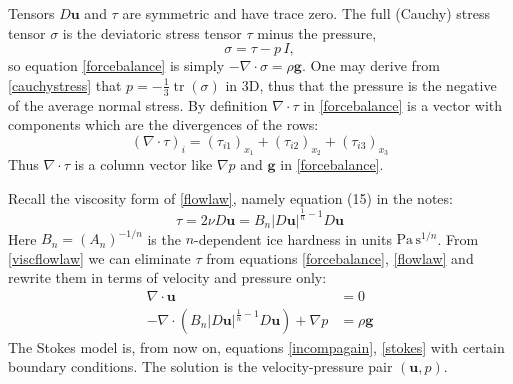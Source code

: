 \documentclass[letterpaper,final,12pt,reqno]{amsart}
\newcommand{\Div}{\nabla\cdot}
\newcommand{\trace}{\operatorname{tr}}
\newcommand{\bg}{\mathbf{g}}
\newcommand{\bu}{\mathbf{u}}
\begin{document}
Tensors $D\bu$ and $\tau$ are symmetric and have trace zero.  The full (Cauchy) stress tensor $\sigma$ is the deviatoric stress tensor $\tau$ minus the pressure,
\begin{equation}
    \sigma = \tau - p\,I,  \label{cauchystress}
\end{equation}
so equation \eqref{forcebalance} is simply $-\Div \sigma = \rho \bg$.  One may derive from \eqref{cauchystress} that $p = -\frac{1}{3} \trace(\sigma)$ in 3D, thus that the pressure is the negative of the average normal stress.  By definition $\Div\tau$ in \eqref{forcebalance} is a vector with components which are the divergences of the rows:
\begin{equation}
    \left(\nabla \cdot \tau\right)_i = \left(\tau_{i1}\right)_{x_1} + \left(\tau_{i2}\right)_{x_2} + \left(\tau_{i3}\right)_{x_3}  \label{divtaudefn}
\end{equation}
Thus $\nabla\cdot \tau$ is a column vector like $\nabla p$ and $\bg$ in \eqref{forcebalance}.

Recall the viscosity form of \eqref{flowlaw}, namely equation (15) in the notes:
\begin{equation}
\tau = 2\nu D\bu = B_n |D\bu|^{\frac{1}{n} - 1} D\bu  \label{viscflowlaw}
\end{equation}
Here $B_n = (A_n)^{-1/n}$ is the $n$-dependent ice hardness in units $\text{Pa}\,\text{s}^{1/n}$.  From \eqref{viscflowlaw} we can eliminate $\tau$ from equations \eqref{forcebalance}, \eqref{flowlaw} and rewrite them in terms of velocity and pressure only:
\begin{align}
\Div \bu &= 0 \label{incompagain} \\
- \nabla \cdot \left(B_n |D\bu|^{\frac{1}{n} - 1} D\bu\right) + \nabla p &= \rho \mathbf{g} \label{stokes}
\end{align}
The Stokes model is, from now on, equations \eqref{incompagain}, \eqref{stokes} with certain boundary conditions.  The solution is the velocity-pressure pair $(\bu,p)$.
\end{document}
